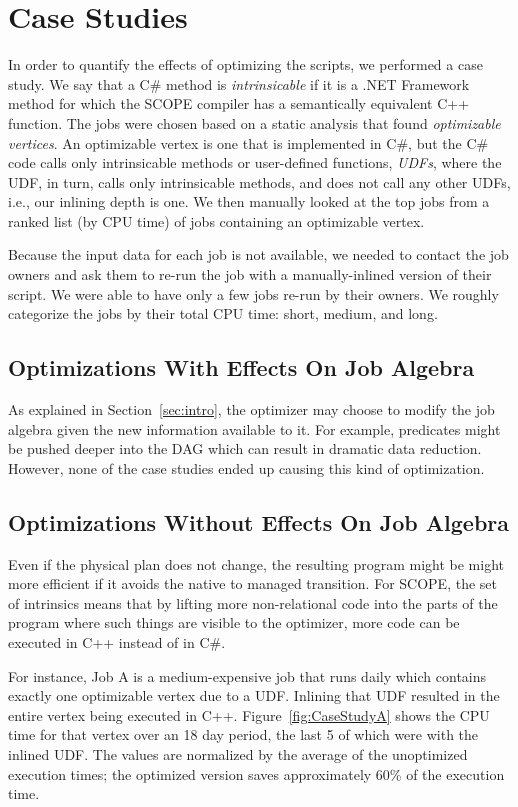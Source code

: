 \section{Case Studies}
\label{sec:caseStudy}
In order to quantify the effects of optimizing the scripts, we performed a case study.
We say that a C\# method is {\em intrinsicable} if it is a .NET Framework method for which the SCOPE compiler has a semantically equivalent C++ function.
The jobs were chosen based on a static analysis that found {\em optimizable vertices}.
An optimizable vertex is one that is implemented in C\#, but the C\# code calls only intrinsicable methods or user-defined functions, {\em UDFs}, where the UDF, in turn, calls only intrinsicable methods, and does not call any other UDFs, i.e., our inlining depth is one.
We then manually looked at the top jobs from  a ranked list (by CPU time) of jobs containing an optimizable vertex.

Because the input data for each job is not available, we needed to contact the job owners and ask them to re-run the job with a manually-inlined version of their script.
We were able to have only a few jobs re-run by their owners.
We roughly categorize the jobs by their total CPU time: short, medium, and long.

\subsection{Optimizations With Effects On Job Algebra}
As explained in Section~\ref{sec:intro}, the optimizer may choose to modify the job algebra given the new information available to it.
For example, predicates might be pushed deeper into the DAG which can result in dramatic data reduction.
However, none of the case studies ended up causing this kind of optimization.


\subsection{Optimizations Without Effects On Job Algebra}
Even if the physical plan does not change, the resulting program might be might more efficient if it avoids the native to managed transition.
For SCOPE, the set of intrinsics means that by lifting more non-relational code into the parts of the program where such things are visible to the optimizer, more code can be executed in C++ instead of in C\#.

For instance, Job A is a medium-expensive job that runs daily which contains exactly one optimizable vertex due to a UDF.
Inlining that UDF resulted in the entire vertex being executed in C++.
Figure~\ref{fig:CaseStudyA} shows the CPU time for that vertex over an 18 day period, the last 5 of which were with the inlined UDF.
The values are normalized by the average of the unoptimized execution times; the optimized version saves approximately 60\% of the execution time.

